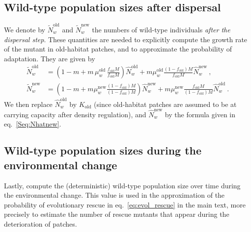 \documentclass[11pt]{article}
\begin{document}
\subsection*{Wild-type population sizes after dispersal}

We denote by $\widetilde{N}_w^{\text{old}}$ and $\widetilde{N}_w^{\text{new}}$ the numbers of wild-type individuals \textit{after the dispersal step}. These quantities are needed to explicitly compute the growth rate of the mutant in old-habitat patches, and to approximate the probability of adaptation. They are given by
%
\begin{subequations}\label{Seq:Ntilde}
\begin{align}
\widetilde{N}_w^{\text{old}} &= \left(1-m + m\, \mu_w^{\text{old}} \,  \frac{f_{\text{old}}M}{f_{\text{old}}M} \right) \widehat{N}_w^{\text{old}} + m \mu_w^{\text{old}} \frac{(1-f_{\text{old}})M}{f_{\text{old}}M}\widehat{N}_w^{\text{new}}\ , \label{Seq:Ntildeold}\\
%
%
\widetilde{N}_w^{\text{new}} &= \left(1-m + m \mu_w^{\text{new}} \frac{(1-f_{\text{old}})M}{(1-f_{\text{old}})M}\right)\widehat{N}_w^{\text{new}} + m \mu_w^{\text{new}} \frac{f_{\text{old}} M}{(1-f_{\text{old}})M} \widehat{N}_w^{\text{old}}\ .\label{Seq:Ntildenew}
\end{align}
\end{subequations}
%
We then replace $\widehat{N}_w^{\text{old}}$ by $K_{\text{old}}$ (since old-habitat patches are assumed to be at carrying capacity after density regulation), and $\widehat{N}_w^{\text{new}}$ by the formula given in eq.~\eqref{Seq:Nhatnew}.


\subsection*{Wild-type population sizes during the environmental change}
Lastly, compute the (deterministic) wild-type population size over time during the environmental change. This value is used in the approximation of the probability of evolutionary rescue in eq.~\eqref{eq:evol_rescue} in the main text, more precisely to estimate the number of rescue mutants that appear during the deterioration of patches.
\end{document}
